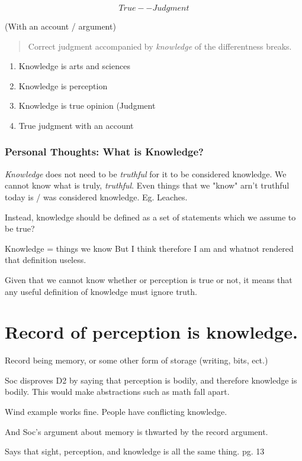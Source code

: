 \documentclass[letterpaper]{article}
\begin{document}
\emph{\[True--Judgment\]}

(With an account / argument)

\begin{quote}
Correct judgment accompanied by \emph{knowledge} of the differentness
breaks.
\end{quote}

\begin{enumerate}
\item Knowledge is arts and sciences
\item Knowledge is perception
\item Knowledge is true opinion (Judgment
\item True judgment with an account
\end{enumerate}

\subsubsection{Personal Thoughts: What is Knowledge?}
\label{sec:org5df7dd1}
\emph{Knowledge} does not need to be \emph{truthful} for it to be considered
knowledge. We cannot know what is truly, \emph{truthful}. Even things that we
"know" arn't truthful today is / was considered knowledge. Eg. Leaches.

Instead, knowledge should be defined as a set of statements which we
assume to be true?

Knowledge = things we know But I think therefore I am and whatnot
rendered that definition useless.

Given that we cannot know whether or perception is true or not, it means
that any useful definition of knowledge must ignore truth.

\section{Record of perception is knowledge.}
\label{sec:orgdc74492}
Record being memory, or some other form of storage (writing, bits, ect.)

Soc disproves D2 by saying that perception is bodily, and therefore
knowledge is bodily. This would make abstractions such as math fall
apart.

Wind example works fine. People have conflicting knowledge.

And Soc's argument about memory is thwarted by the record argument.

Says that sight, perception, and knowledge is all the same thing. pg. 13
\end{document}

